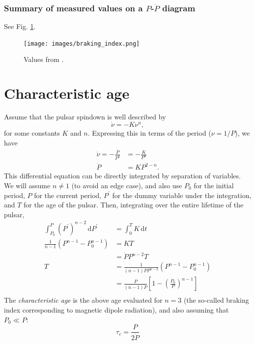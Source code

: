 \documentclass{book}
\begin{document}
\subsubsection{Summary of measured values on a $P$-$\dot{P}$ diagram}

See Fig. \ref{fig:braking_index_measurements}.
\begin{figure}[!t]
    \centering
    \texttt{[image: images/braking\_index.png]}
    \caption{Values from \citet{Archibald2016}.}
    \label{fig:braking_index_measurements}
\end{figure}


\section{Characteristic age}

\citep[This same derivation is given briefly in][\S3.2.2.]{Lorimer2005}
Assume that the pulsar spindown is well described by
\begin{equation}
    \dot{\nu} = -K\nu^n,
\end{equation}
for some constants $K$ and $n$.
Expressing this in terms of the period ($\nu = 1/P$), we have
\begin{equation}
    \begin{aligned}
        \dot{\nu} = -\frac{\dot{P}}{P^2}
            &= -\frac{K}{P^n} \\
        \dot{P} &= KP^{2-n}.
    \end{aligned}
\end{equation}
This differential equation can be directly integrated by separation of variables.
We will assume $n \ne 1$ (to avoid an edge case), and also use $P_0$ for the initial period, $P$ for the current period, $P^\prime$ for the dummy variable under the integration, and $T$ for the age of the pulsar.
Then, integrating over the entire lifetime of the pulsar,
\begin{equation}
    \begin{aligned}
        \int_{P_0}^{P} (P^\prime)^{n-2}\,\text{d}P^\prime
            &= \int_0^T K\,\text{d}t \\
        \frac{1}{n-1}\left(P^{n-1} - P_0^{n-1}\right)
            &= KT \\
            &= \dot{P} P^{n-2} T \\
        T   &= \frac{1}{(n-1)\dot{P}P^{n-2}}\left(P^{n-1} - P_0^{n-1}\right) \\
            &= \frac{P}{(n-1)\dot{P}}\left[1 - \left(\frac{P_0}{P}\right)^{n-1}\right] \\
    \end{aligned}
\end{equation}
The \emph{characteristic age} is the above age evaluated for $n = 3$ (the so-called braking index corresponding to magnetic dipole radiation), and also assuming that $P_0 \ll P$:
\begin{equation}
    \tau_c = \frac{P}{2\dot{P}}
\end{equation}
\end{document}
